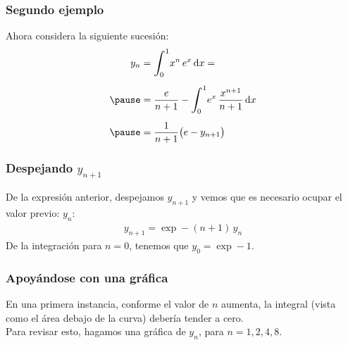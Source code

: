 \documentclass[12pt]{beamer}
\begin{document}
\begin{frame}
\frametitle{Segundo ejemplo}
Ahora considera la siguiente sucesión:
\pause
\begin{eqnarray*}
\begin{aligned}
y_{n} &= \scaleint{6ex}_{\bs 0}^{1} x^{n} \, e^{x} \dd{x} = \\[0.5em] \pause
&= \dfrac{e}{n+1} - \scaleint{6ex}_{\bs 0}^{1} e^{x} \, \dfrac{x^{n+1}}{n + 1} \dd{x} \\[0.5em] \pause
&= \dfrac{1}{n+1} \big( e - y_{n+1} \big)
\end{aligned}
\end{eqnarray*}
\end{frame}
\begin{frame}
\frametitle{Despejando $y_{n+1}$}
De la expresión anterior, despejamos $y_{n+1}$ y vemos que es necesario ocupar el valor previo: $y_{n}$:
\pause
\begin{align*}
y_{n+1} = \exp - (n + 1) \, y_{n}
\end{align*}
De la integración para $n = 0$, tenemos que $y_{0} = \exp - 1$.
\end{frame}
\begin{frame}
\frametitle{Apoyándose con una gráfica}
En una primera instancia, conforme el valor de $n$ aumenta, la integral (vista como el área debajo de la curva) debería tender a cero.
\\
\bigskip
\pause
Para revisar esto, hagamos una gráfica de $y_{n}$, para $n = 1, 2, 4, 8$.
\end{frame}
\end{document}
